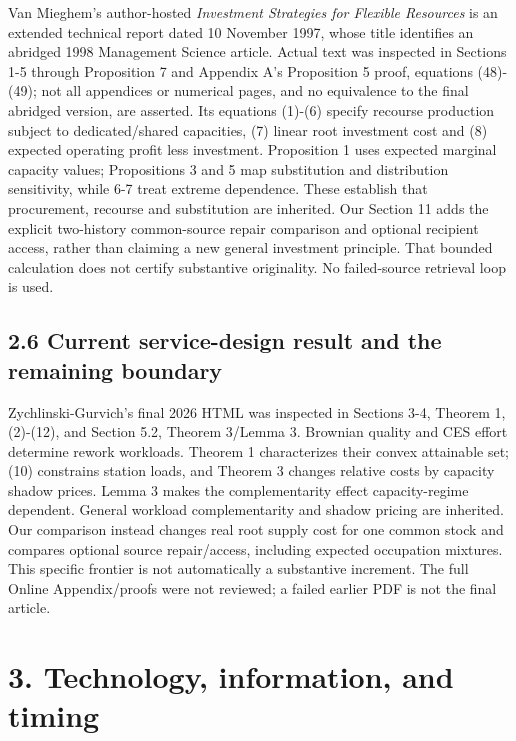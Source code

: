 \documentclass[
  11pt,
  a4paper,
]{article}
\begin{document}
Van Mieghem's author-hosted \emph{Investment Strategies for Flexible
Resources} is an extended technical report dated 10 November 1997, whose
title identifies an abridged 1998 Management Science article. Actual
text was inspected in Sections 1-5 through Proposition 7 and Appendix
A's Proposition 5 proof, equations (48)-(49); not all appendices or
numerical pages, and no equivalence to the final abridged version, are
asserted. Its equations (1)-(6) specify recourse production subject to
dedicated/shared capacities, (7) linear root investment cost and (8)
expected operating profit less investment. Proposition 1 uses expected
marginal capacity values; Propositions 3 and 5 map substitution and
distribution sensitivity, while 6-7 treat extreme dependence. These
establish that procurement, recourse and substitution are inherited. Our
Section 11 adds the explicit two-history common-source repair comparison
and optional recipient access, rather than claiming a new general
investment principle. That bounded calculation does not certify
substantive originality. No failed-source retrieval loop is used.

\hypertarget{current-service-design-result-and-the-remaining-boundary}{%
\subsection{2.6 Current service-design result and the remaining
boundary}\label{current-service-design-result-and-the-remaining-boundary}}

Zychlinski-Gurvich's final 2026 HTML was inspected in Sections 3-4,
Theorem 1, (2)-(12), and Section 5.2, Theorem 3/Lemma 3. Brownian
quality and CES effort determine rework workloads. Theorem 1
characterizes their convex attainable set; (10) constrains station
loads, and Theorem 3 changes relative costs by capacity shadow prices.
Lemma 3 makes the complementarity effect capacity-regime dependent.
General workload complementarity and shadow pricing are inherited. Our
comparison instead changes real root supply cost for one common stock
and compares optional source repair/access, including expected
occupation mixtures. This specific frontier is not automatically a
substantive increment. The full Online Appendix/proofs were not
reviewed; a failed earlier PDF is not the final article.

\hypertarget{technology-information-and-timing}{%
\section{3. Technology, information, and
timing}\label{technology-information-and-timing}}
\end{document}
